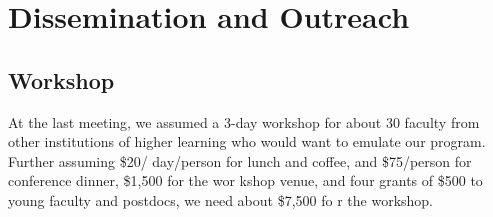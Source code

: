 \section{Dissemination and Outreach}
\label{sec:outreach}
\subsection{Workshop} 
\label{sec:workshop}

At the last meeting, we assumed a 3-day workshop for about 30 faculty
from other institutions of higher learning who would want to emulate
our program. Further assuming \$20/ day/person for lunch and coffee,
and \$75/person for conference dinner, \$1,500 for the wor kshop
venue, and four grants of \$500 to young faculty and postdocs, we need
about \$7,500 fo r the workshop.
